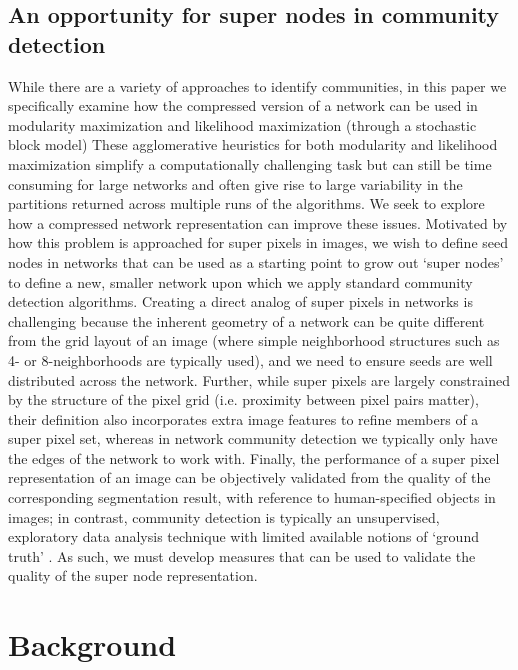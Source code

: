 \subsection{An opportunity for super nodes in community detection}
While there are a variety of approaches to identify communities, in this paper we specifically examine how the compressed version of a network can be used in modularity maximization and likelihood maximization (through a stochastic block model)
 These agglomerative heuristics for both modularity and likelihood maximization simplify a computationally challenging task but can still be time consuming for large networks and often give rise to large variability in the partitions returned across multiple runs of the algorithms. We seek to explore how a compressed network representation can improve these issues. Motivated by how this problem is approached for super pixels in images, we wish to define seed nodes in networks that can be used as a starting point to grow out `super nodes' to define a new, smaller network upon which we apply standard community detection algorithms. Creating a direct analog of super pixels in networks is challenging because the inherent geometry of a network can be quite different from the grid layout of an image (where simple neighborhood structures such as 4- or 8-neighborhoods are typically used), and we need to ensure seeds are well distributed across the network. Further, while super pixels are largely constrained by the structure of the pixel grid (i.e. proximity between pixel pairs matter), their definition also incorporates extra image features to refine members of a super pixel set, whereas in network community detection we typically only have the edges of the network to work with. Finally, the performance of a super pixel representation of an image can be objectively validated from the quality of the corresponding segmentation result, with reference to human-specified objects in images; in contrast, community detection is typically an unsupervised, exploratory data analysis technique with limited available notions of `ground truth' \cite{jureTruth}. As such, we must develop measures that can be used to validate the quality of the super node representation.
 
 \section{Background}

